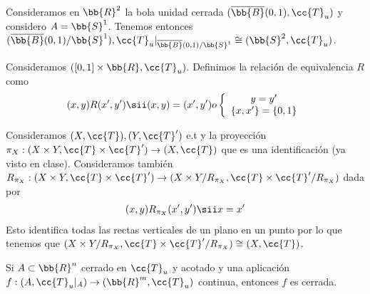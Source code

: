 \begin{ejemplo}
    Consideramos en $\bb{R}^2$ la bola unidad cerrada $(\overline{\bb{B}}(0,1), \cc{T}_u)$ y considero $A=\bb{S}^1$. Tenemos entonces $(\overline{\bb{B}}(0,1)/\bb{S}^1), \cc{T}_u|_{\overline{\bb{B}}(0,1)/\bb{S}^1}\cong (\bb{S}^2, \cc{T}_u)$.
    \endsquare
\end{ejemplo}

\begin{ejemplo}
    Consideramos $([0,1]\times \bb{R}, \cc{T}_u)$. Definimos la relación de equivalencia $R$ como 
    \begin{align*}
        (x,y)R(x',y') \sii (x,y)=(x',y') o \left\{
        \begin{array}{c}
            y=y'\\
            \{x,x'\}=\{0,1\}
        \end{array}
        \right.
    \end{align*}
    \endsquare
\end{ejemplo}

\begin{ejemplo}
    Consideramos $(X, \cc{T}), (Y, \cc{T}')$ e.t y la proyección $\pi_X:(X\times Y, \cc{T}\times \cc{T}')\to (X, \cc{T})$ que es una identificación (ya visto en clase). Consideramos también $R_{\pi_X}: (X\times Y, \cc{T}\times \cc{T}') \to (X\times Y / R_{\pi_X}, \cc{T}\times \cc{T}'/R_{\pi_X})$ dada por 
    \begin{align*}
        (x,y)R_{\pi_X}(x',y') \sii x=x'
    \end{align*}
    Esto identifica todas las rectas verticales de un plano en un punto por lo que tenemos que $(X\times Y / R_{\pi_X}, \cc{T}\times \cc{T}'/R_{\pi_X})\cong (X, \cc{T})$.
    \endsquare
\end{ejemplo}

\begin{lema}
    Si $A\subset \bb{R}^n$ cerrado en $\cc{T}_u$ y acotado y una aplicación $f:(A, \cc{T}_u|_A)\to (\bb{R}^m, \cc{T}_u)$ continua, entonces $f$ es cerrada.
    \endsquare
\end{lema}

